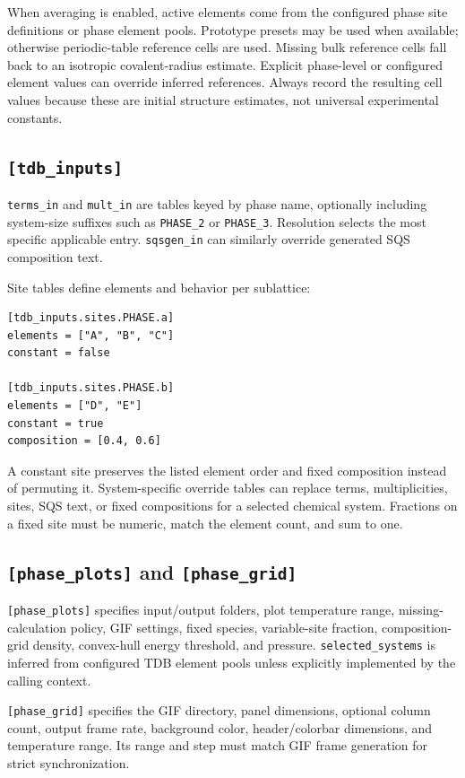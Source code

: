 \documentclass[11pt,letterpaper]{article}
\newcommand{\file}[1]{\nolinkurl{#1}}
\newcommand{\setting}[1]{\nolinkurl{#1}}
\begin{document}
When averaging is enabled, active elements come from the configured phase
site definitions or phase element pools. Prototype presets may be used when
available; otherwise periodic-table reference cells are used. Missing bulk
reference cells fall back to an isotropic covalent-radius estimate. Explicit
phase-level or configured element values can override inferred references.
Always record the resulting cell values because these are initial structure
estimates, not universal experimental constants.

\subsection{\texttt{[tdb\_inputs]}}

\setting{terms_in} and \setting{mult_in} are tables keyed by phase name,
optionally including system-size suffixes such as \file{PHASE_2} or
\file{PHASE_3}. Resolution selects the most specific applicable entry.
\setting{sqsgen_in} can similarly override generated SQS composition text.

Site tables define elements and behavior per sublattice:
\begin{lstlisting}
[tdb_inputs.sites.PHASE.a]
elements = ["A", "B", "C"]
constant = false

[tdb_inputs.sites.PHASE.b]
elements = ["D", "E"]
constant = true
composition = [0.4, 0.6]
\end{lstlisting}

A constant site preserves the listed element order and fixed composition
instead of permuting it. System-specific override tables can replace terms,
multiplicities, sites, SQS text, or fixed compositions for a selected chemical
system. Fractions on a fixed site must be numeric, match the element count,
and sum to one.

\subsection{\texttt{[phase\_plots]} and \texttt{[phase\_grid]}}

\setting{[phase_plots]} specifies input/output folders, plot temperature
range, missing-calculation policy, GIF settings, fixed species, variable-site
fraction, composition-grid density, convex-hull energy threshold, and
pressure. \setting{selected_systems} is inferred from configured TDB element
pools unless explicitly implemented by the calling context.

\setting{[phase_grid]} specifies the GIF directory, panel dimensions, optional
column count, output frame rate, background color, header/colorbar dimensions,
and temperature range. Its range and step must match GIF frame generation for
strict synchronization.
\end{document}
